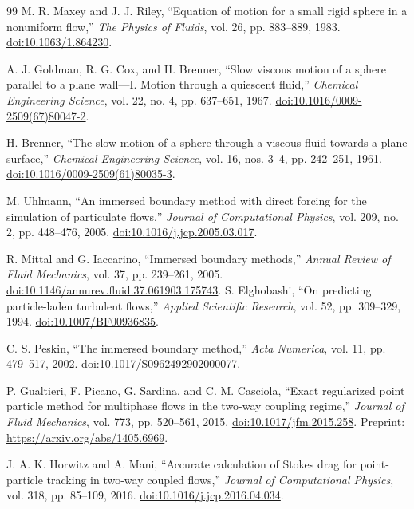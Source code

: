 \begin{thebibliography}{99}
M. R. Maxey and J. J. Riley, ``Equation of motion for a small rigid sphere
in a nonuniform flow,'' \emph{The Physics of Fluids}, vol. 26,
pp. 883--889, 1983.
\href{https://doi.org/10.1063/1.864230}{doi:10.1063/1.864230}.

A. J. Goldman, R. G. Cox, and H. Brenner, ``Slow viscous motion of a sphere
parallel to a plane wall---I. Motion through a quiescent fluid,''
\emph{Chemical Engineering Science}, vol. 22, no. 4, pp. 637--651, 1967.
\href{https://doi.org/10.1016/0009-2509(67)80047-2}{doi:10.1016/0009-2509(67)80047-2}.

H. Brenner, ``The slow motion of a sphere through a viscous fluid towards
a plane surface,'' \emph{Chemical Engineering Science}, vol. 16,
nos. 3--4, pp. 242--251, 1961.
\href{https://doi.org/10.1016/0009-2509(61)80035-3}{doi:10.1016/0009-2509(61)80035-3}.

M. Uhlmann, ``An immersed boundary method with direct forcing for the
simulation of particulate flows,'' \emph{Journal of Computational Physics},
vol. 209, no. 2, pp. 448--476, 2005.
\href{https://doi.org/10.1016/j.jcp.2005.03.017}{doi:10.1016/j.jcp.2005.03.017}.

R. Mittal and G. Iaccarino, ``Immersed boundary methods,'' \emph{Annual
Review of Fluid Mechanics}, vol. 37, pp. 239--261, 2005.
\href{https://doi.org/10.1146/annurev.fluid.37.061903.175743}{doi:10.1146/annurev.fluid.37.061903.175743}.
S. Elghobashi, ``On predicting particle-laden turbulent flows,''
\emph{Applied Scientific Research}, vol. 52, pp. 309--329, 1994.
\href{https://doi.org/10.1007/BF00936835}{doi:10.1007/BF00936835}.

C. S. Peskin, ``The immersed boundary method,'' \emph{Acta Numerica},
vol. 11, pp. 479--517, 2002.
\href{https://doi.org/10.1017/S0962492902000077}{doi:10.1017/S0962492902000077}.

P. Gualtieri, F. Picano, G. Sardina, and C. M. Casciola,
``Exact regularized point particle method for multiphase flows in the
two-way coupling regime,'' \emph{Journal of Fluid Mechanics}, vol. 773,
pp. 520--561, 2015.
\href{https://doi.org/10.1017/jfm.2015.258}{doi:10.1017/jfm.2015.258}.
Preprint: \url{https://arxiv.org/abs/1405.6969}.

J. A. K. Horwitz and A. Mani, ``Accurate calculation of Stokes drag for
point-particle tracking in two-way coupled flows,'' \emph{Journal of
Computational Physics}, vol. 318, pp. 85--109, 2016.
\href{https://doi.org/10.1016/j.jcp.2016.04.034}{doi:10.1016/j.jcp.2016.04.034}.


\end{thebibliography}
